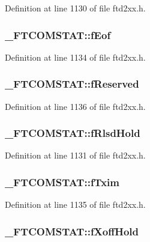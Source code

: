 Definition at line 1130 of file ftd2xx.h.\hypertarget{struct__FTCOMSTAT_a2a4cdfc245e72f74b032f7a5cc220fd3}{
\subsubsection[{fEof}]{ {\bf \_\-FTCOMSTAT::fEof}}}
\label{struct__FTCOMSTAT_a2a4cdfc245e72f74b032f7a5cc220fd3}


Definition at line 1134 of file ftd2xx.h.\hypertarget{struct__FTCOMSTAT_a567f611e7f3dc193ff94ac4c44fbc500}{
\subsubsection[{fReserved}]{ {\bf \_\-FTCOMSTAT::fReserved}}}
\label{struct__FTCOMSTAT_a567f611e7f3dc193ff94ac4c44fbc500}


Definition at line 1136 of file ftd2xx.h.\hypertarget{struct__FTCOMSTAT_afb2b9a88896f528efbe6c9ff73b7744c}{
\subsubsection[{fRlsdHold}]{ {\bf \_\-FTCOMSTAT::fRlsdHold}}}
\label{struct__FTCOMSTAT_afb2b9a88896f528efbe6c9ff73b7744c}


Definition at line 1131 of file ftd2xx.h.\hypertarget{struct__FTCOMSTAT_a04853d07abaf4fb47891a3bbdd78be8d}{
\subsubsection[{fTxim}]{ {\bf \_\-FTCOMSTAT::fTxim}}}
\label{struct__FTCOMSTAT_a04853d07abaf4fb47891a3bbdd78be8d}


Definition at line 1135 of file ftd2xx.h.\hypertarget{struct__FTCOMSTAT_a5b2fd786cc95e60df49aa55f7d4d7d5a}{
\subsubsection[{fXoffHold}]{ {\bf \_\-FTCOMSTAT::fXoffHold}}}
\label{struct__FTCOMSTAT_a5b2fd786cc95e60df49aa55f7d4d7d5a}


